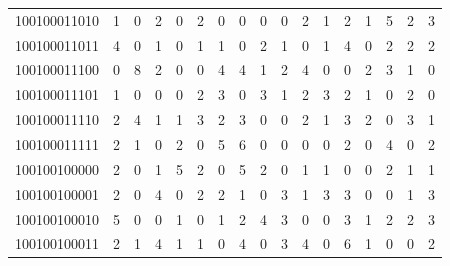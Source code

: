 \documentclass[10pt,a4paper]{article}
\begin{document}
\begin{longtable}{ |c|c|c|c|c|c|c|c|c|c|c|c|c|c|c|c|c| }
    100100011010              & 1                            & 0                                & 2                            & 0                              & 2   & 0   & 0   & 0   & 0   & 2   & 1   & 2   & 1   & 5   & 2   & 3   \\
    100100011011              & 4                            & 0                                & 1                            & 0                              & 1   & 1   & 0   & 2   & 1   & 0   & 1   & 4   & 0   & 2   & 2   & 2   \\
    100100011100              & 0                            & 8                                & 2                            & 0                              & 0   & 4   & 4   & 1   & 2   & 4   & 0   & 0   & 2   & 3   & 1   & 0   \\
    100100011101              & 1                            & 0                                & 0                            & 0                              & 2   & 3   & 0   & 3   & 1   & 2   & 3   & 2   & 1   & 0   & 2   & 0   \\
    100100011110              & 2                            & 4                                & 1                            & 1                              & 3   & 2   & 3   & 0   & 0   & 2   & 1   & 3   & 2   & 0   & 3   & 1   \\
    100100011111              & 2                            & 1                                & 0                            & 2                              & 0   & 5   & 6   & 0   & 0   & 0   & 0   & 2   & 0   & 4   & 0   & 2   \\
    100100100000              & 2                            & 0                                & 1                            & 5                              & 2   & 0   & 5   & 2   & 0   & 1   & 1   & 0   & 0   & 2   & 1   & 1   \\
    100100100001              & 2                            & 0                                & 4                            & 0                              & 2   & 2   & 1   & 0   & 3   & 1   & 3   & 3   & 0   & 0   & 1   & 3   \\
    100100100010              & 5                            & 0                                & 0                            & 1                              & 0   & 1   & 2   & 4   & 3   & 0   & 0   & 3   & 1   & 2   & 2   & 3   \\
    100100100011              & 2                            & 1                                & 4                            & 1                              & 1   & 0   & 4   & 0   & 3   & 4   & 0   & 6   & 1   & 0   & 0   & 2   \\

\end{longtable}
\end{document}
